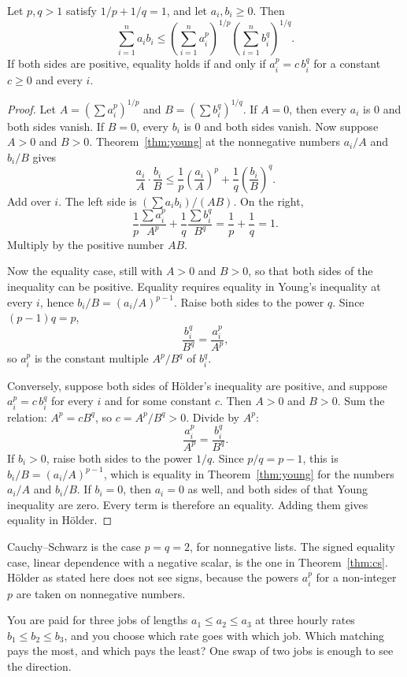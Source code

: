 \begin{theorem}[H\"older]\label{thm:holder}
Let $p,q>1$ satisfy $1/p+1/q=1$, and let $a_i,b_i\ge0$. Then
\[
\sum_{i=1}^na_ib_i\le\left(\sum_{i=1}^na_i^p\right)^{1/p}\left(\sum_{i=1}^nb_i^q\right)^{1/q}.
\]
If both sides are positive, equality holds if and only if $a_i^p=c\,b_i^q$ for a constant $c\ge0$ and every $i$.
\end{theorem}
\begin{proof}
Let $A=(\sum a_i^p)^{1/p}$ and $B=(\sum b_i^q)^{1/q}$. If $A=0$, then every $a_i$ is $0$ and both sides vanish. If $B=0$, every $b_i$ is $0$ and both sides vanish. Now suppose $A>0$ and $B>0$. Theorem~\ref{thm:young} at the nonnegative numbers $a_i/A$ and $b_i/B$ gives
\[
\frac{a_i}{A}\cdot\frac{b_i}{B}\le\frac1p\left(\frac{a_i}{A}\right)^p+\frac1q\left(\frac{b_i}{B}\right)^q.
\]
Add over $i$. The left side is $(\sum a_ib_i)/(AB)$. On the right,
\[
\frac1p\frac{\sum a_i^p}{A^p}+\frac1q\frac{\sum b_i^q}{B^q}=\frac1p+\frac1q=1.
\]
Multiply by the positive number $AB$.

Now the equality case, still with $A>0$ and $B>0$, so that both sides of the inequality can be positive. Equality requires equality in Young's inequality at every $i$, hence $b_i/B=(a_i/A)^{p-1}$. Raise both sides to the power $q$. Since $(p-1)q=p$,
\[
\frac{b_i^q}{B^q}=\frac{a_i^p}{A^p},
\]
so $a_i^p$ is the constant multiple $A^p/B^q$ of $b_i^q$.

Conversely, suppose both sides of Hölder's inequality are positive, and suppose $a_i^p=c\,b_i^q$ for every $i$ and for some constant $c$. Then $A>0$ and $B>0$. Sum the relation: $A^p=cB^q$, so $c=A^p/B^q>0$. Divide by $A^p$:
\[
\frac{a_i^p}{A^p}=\frac{b_i^q}{B^q}.
\]
If $b_i>0$, raise both sides to the power $1/q$. Since $p/q=p-1$, this is $b_i/B=(a_i/A)^{p-1}$, which is equality in Theorem~\ref{thm:young} for the numbers $a_i/A$ and $b_i/B$. If $b_i=0$, then $a_i=0$ as well, and both sides of that Young inequality are zero. Every term is therefore an equality. Adding them gives equality in Hölder.
\end{proof}

Cauchy--Schwarz is the case $p=q=2$, for nonnegative lists. The signed equality case, linear dependence with a negative scalar, is the one in Theorem~\ref{thm:cs}. H\"older as stated here does not see signs, because the powers $a_i^p$ for a non-integer $p$ are taken on nonnegative numbers.

\begin{think}
You are paid for three jobs of lengths $a_1\le a_2\le a_3$ at three hourly rates $b_1\le b_2\le b_3$, and you choose which rate goes with which job. Which matching pays the most, and which pays the least? One swap of two jobs is enough to see the direction.
\end{think}

